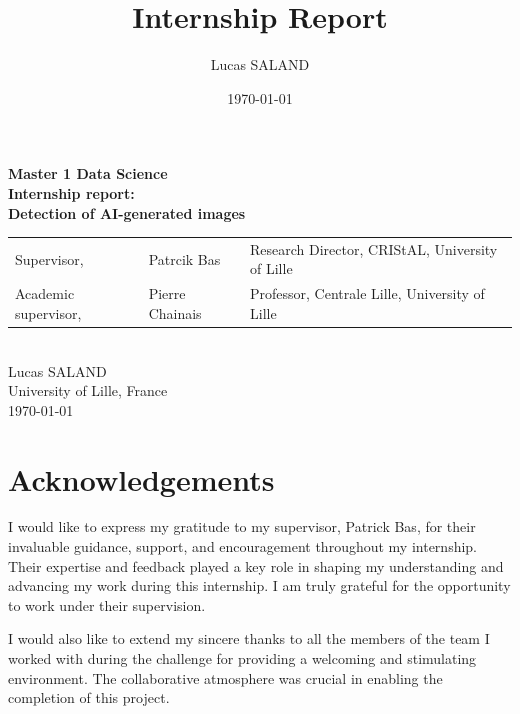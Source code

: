 \documentclass[12pt,a4paper]{article}
\title{Internship Report}
\author{Lucas SALAND}
\date{\today}
\begin{document}
\begin{titlepage}
    \begin{center}
        \Large
        \textbf{Master 1 Data Science}\\
        \vspace*{.5cm}
        \LARGE
        \textbf{Internship report: \\Detection of AI-generated images}\\
        \vspace{1cm}
        \small
        \vfill
        \begin{tabular}{lll}
            Supervisor, & Patrcik Bas & Research Director, CRIStAL, University of Lille\\
            Academic supervisor, & Pierre Chainais & Professor, Centrale Lille, University of Lille\\
        \end{tabular}
        \vspace{1cm}\\
        \large
        Lucas SALAND\\
        University of Lille, France\\
        \today\\
    \end{center}
\end{titlepage}
\newpage
\section*{Acknowledgements}
I would like to express my gratitude to my supervisor, Patrick Bas, for their invaluable guidance, support, and encouragement throughout my internship. Their expertise and feedback played a key role in shaping my understanding and advancing my work during this internship. I am truly grateful for the opportunity to work under their supervision.

\noindent I would also like to extend my sincere thanks to all the members of the team I worked with during the challenge for providing a welcoming and stimulating environment. The collaborative atmosphere was crucial in enabling the completion of this project.

\newpage

\tableofcontents
\newpage
\end{document}

